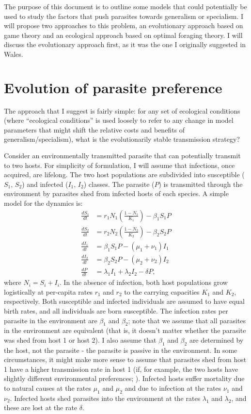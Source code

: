 \documentclass[11pt,reqno,final,pdftex]{amsart}\usepackage[]{graphicx}\usepackage[]{color}
\theoremstyle{plain}
\numberwithin{equation}{part}
\begin{document}
The purpose of this document is to outline some models that could potentially be used to study the factors that push parasites towards generalism or specialism.
I will propose two approaches to this problem, an evolutionary approach based on game theory and an ecological approach based on optimal foraging theory.
I will discuss the evolutionary approach first, as it was the one I originally suggested in Wales.

\section{Evolution of parasite preference}
The approach that I suggest is fairly simple: for any set of ecological conditions (where ``ecological conditions'' is used loosely to refer to any change in model parameters that might shift the relative costs and benefits of generalism/specialism), what is the evolutionarily stable transmission strategy?

Consider an environmentally transmitted parasite that can potentially transmit to two hosts.
For simplicity of formulation, I will assume that infections, once acquired, are lifelong.
The two host populations are subdivided into susceptible ($S_1$, $S_2$) and
infected ($I_1$, $I_2$) classes.
The parasite ($P$) is transmitted through the environment by parasites shed from infected hosts of each species.
A simple model for the dynamics is:
\begin{align*}
\frac{dS_1}{dt} &= r_1 N_1 \left(\frac{1-N_1}{K_1}\right) - \beta_1 S_1 P \\
\frac{dS_2}{dt} &= r_2 N_2 \left(\frac{1-N_2}{K_2}\right) - \beta_2 S_2 P \\
\frac{dI_1}{dt} &= \beta_1 S_1 P - (\mu_1 + \nu_1) I_1 \\
\frac{dI_2}{dt} &= \beta_2 S_2 P - (\mu_2 + \nu_2) I_2 \\
\frac{dP}{dt} &= \lambda_1 I_1 + \lambda_2 I_2 - \delta P,
\end{align*}
where $N_i = S_i + I_i$.
In the absence of infection, both host populations grow logistically at per-capita rates $r_1$ and $r_2$ to the carrying capacities $K_1$ and $K_2$, respectively.
Both susceptible and infected individuals are assumed to have equal birth rates, and all individuals are born susceptible.
The infection rates per parasite in the environment are $\beta_1$ and $\beta_2$; note that we assume that all parasites in the environment are equivalent (that is, it doesn't matter whether the parasite was shed from host 1 or host 2).
I also assume that $\beta_1$ and $\beta_2$ are determined by the host, not the parasite - the parasite is passive in the environment.
In some circumstances, it might make more sense to assume that parasites shed from host 1 have a higher transmission rate in host 1 (if, for example, the two hosts have slightly different environmental preferences; \cite{Fenton2015}).
Infected hosts suffer mortality due to natural causes at the rates $\mu_1$ and $\mu_2$ and due to infection at the rates $\nu_1$ and $\nu_2$.
Infected hosts shed parasites into the environment at the rates $\lambda_1$ and $\lambda_2$, and these are lost at the rate $\delta$.
\end{document}
